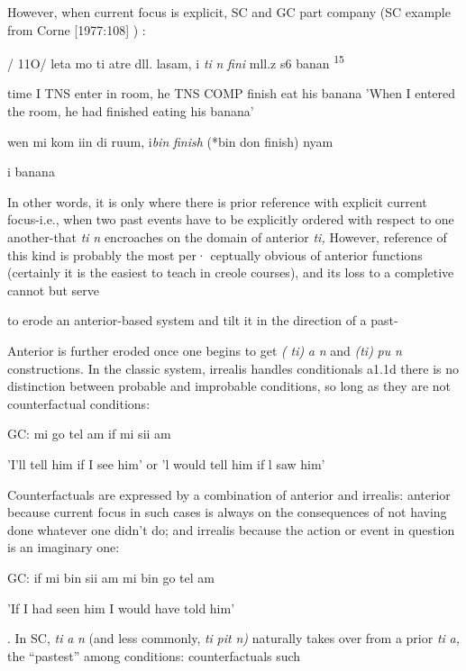 However, when current focus is explicit, SC and GC part com\-pany (SC example from Corne [1977:108] ) :

/ 11O/ leta mo ti atre dll. lasam, i \textit{ti} \textit{n} \textit{fini }mll.z s6 banan \textsuperscript{15}

time I TNS enter in room, he TNS COMP finish eat his banana 'When I entered the room, he had finished eating his banana'

\ea\label{ex:111}
 wen mi kom iin di ruum, i\textit{bin} \textit{finish }(*bin don finish) nyam
\glt
\z

i banana

In other words, it is only where there is prior reference with explicit current focus-i.e., when two past events have to be explicitly ordered with respect to one another-that \textit{ti} \textit{n} encroaches on the domain of anterior \textit{ti,} However, reference of this kind is probably the most per· ceptually obvious of anterior functions (certainly it is the easiest to teach in creole courses), and its loss to a completive cannot but serve

to erode an anterior-based system and tilt it in the direction of a past-


Anterior is further eroded once one begins to get \textit{(} \textit{ti)} \textit{a} \textit{n} and \textit{(ti)} \textit{pu} \textit{n} constructions. In the classic system, irrealis handles condi\-tionals a1.1d there is no distinction between probable and improbable conditions, so long as they are not counterfactual conditions:

\ea\label{ex:112}
 GC: mi go tel am if mi sii am
\glt
\z

'I'll tell him if I see him' or 'l would tell him if l saw him'

Counterfactuals are expressed by a combination of anterior and irrealis: anterior because current focus in such cases is always on the conse\-quences of not having done whatever one didn't do; and irrealis because the action or event in question is an imaginary one:

\ea\label{ex:113}
 GC: if mi bin sii am mi bin go tel am
\glt
\z

'If I had seen him I would have told him'

. In SC, \textit{ti} \textit{a} \textit{n} (and less commonly, \textit{ti} \textit{pit} \textit{n}\textit{)} naturally takes over from a prior \textit{ti} \textit{a,} the ``pastest'' among conditions: counterfactuals such

